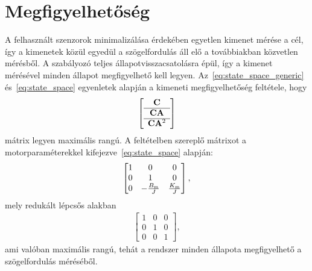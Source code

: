\chapter{Megfigyelhetőség}\label{chap:observability}
A felhasznált szenzorok minimalizálása érdekében egyetlen kimenet mérése a cél, így a kimenetek közül egyedül a 
szögelfordulás áll elő a továbbiakban közvetlen mérésből. A szabályozó teljes állapotvisszacsatolásra épül, 
így a kimenet mérésével minden állapot megfigyelhető kell legyen. 
Az~\eqref{eq:state_space_generic} és~\eqref{eq:state_space} egyenletek alapján a kimeneti megfigyelhetőség feltétele, hogy
\begin{align}
    \left[\begin{array}{c}
        \mathbf{C} \\ \hline
        \mathbf{CA} \\ \hline
        \mathbf{C} \mathbf{A}^2
    \end{array}\right]
\end{align}
mátrix legyen maximális rangú. A feltételben szereplő mátrixot a motorparaméterekkel kifejezve~\eqref{eq:state_space} alapján:
\begin{align}
    \begin{bmatrix}
        1 & 0 & 0 \\
        0 & 1 & 0 \\
        0 & -\frac{B_{\mathrm{m}}}{J} & \frac{K_{\mathrm{m}}}{J}
    \end{bmatrix},
\end{align}
mely redukált lépcsős alakban
\begin{align}
    \begin{bmatrix}
        1 & 0 & 0 \\
        0 & 1 & 0 \\
        0 & 0 & 1
    \end{bmatrix},
\end{align}
ami valóban maximális rangú, tehát a rendszer minden állapota megfigyelhető a szögelfordulás méréséből.
